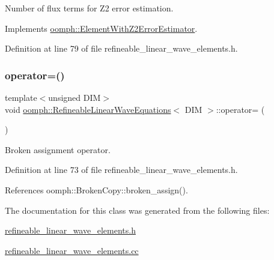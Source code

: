 Number of \textquotesingle{}flux\textquotesingle{} terms for Z2 error estimation. 



Implements \hyperlink{classoomph_1_1ElementWithZ2ErrorEstimator_ae82c5728902e13da31be19c390fc28e3}{oomph\+::\+Element\+With\+Z2\+Error\+Estimator}.



Definition at line 79 of file refineable\+\_\+linear\+\_\+wave\+\_\+elements.\+h.

\mbox{\label{classoomph_1_1RefineableLinearWaveEquations_a2a71c6a176c35fa60170677f1dfc5799}} 
\subsubsection{\texorpdfstring{operator=()}{operator=()}}
{\footnotesize\ttfamily template$<$unsigned D\+IM$>$ \\
void \hyperlink{classoomph_1_1RefineableLinearWaveEquations}{oomph\+::\+Refineable\+Linear\+Wave\+Equations}$<$ D\+IM $>$\+::operator= (\begin{DoxyParamCaption}\item[{const \hyperlink{classoomph_1_1RefineableLinearWaveEquations}{Refineable\+Linear\+Wave\+Equations}$<$ D\+IM $>$ \&}]{ }\end{DoxyParamCaption})\hspace{0.3cm}{\ttfamily [inline]}}



Broken assignment operator. 



Definition at line 73 of file refineable\+\_\+linear\+\_\+wave\+\_\+elements.\+h.



References oomph\+::\+Broken\+Copy\+::broken\+\_\+assign().



The documentation for this class was generated from the following files\+:\begin{DoxyCompactItemize}
\item 
\hyperlink{refineable__linear__wave__elements_8h}{refineable\+\_\+linear\+\_\+wave\+\_\+elements.\+h}\item 
\hyperlink{refineable__linear__wave__elements_8cc}{refineable\+\_\+linear\+\_\+wave\+\_\+elements.\+cc}\end{DoxyCompactItemize}
